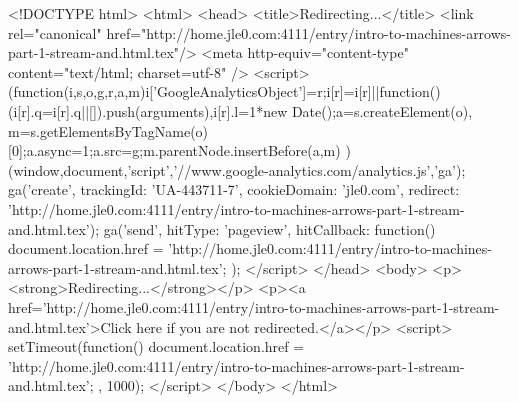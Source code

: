<!DOCTYPE html>
<html>
<head>
<title>Redirecting...</title>
<link rel="canonical" href="http://home.jle0.com:4111/entry/intro-to-machines-arrows-part-1-stream-and.html.tex"/>
<meta http-equiv="content-type" content="text/html; charset=utf-8" />
<script>
(function(i,s,o,g,r,a,m){i['GoogleAnalyticsObject']=r;i[r]=i[r]||function(){
(i[r].q=i[r].q||[]).push(arguments)},i[r].l=1*new Date();a=s.createElement(o),
m=s.getElementsByTagName(o)[0];a.async=1;a.src=g;m.parentNode.insertBefore(a,m)
})(window,document,'script','//www.google-analytics.com/analytics.js','ga');
ga('create', { trackingId: 'UA-443711-7', cookieDomain: 'jle0.com', redirect: 'http://home.jle0.com:4111/entry/intro-to-machines-arrows-part-1-stream-and.html.tex'});
ga('send', { hitType: 'pageview', hitCallback: function() { document.location.href = 'http://home.jle0.com:4111/entry/intro-to-machines-arrows-part-1-stream-and.html.tex'; } });
</script>
</head>
<body>
  <p><strong>Redirecting...</strong></p>
  <p><a href='http://home.jle0.com:4111/entry/intro-to-machines-arrows-part-1-stream-and.html.tex'>Click here if you are not redirected.</a></p>
  <script>
    setTimeout(function() { document.location.href = 'http://home.jle0.com:4111/entry/intro-to-machines-arrows-part-1-stream-and.html.tex'; }, 1000);
  </script>
</body>
</html>
